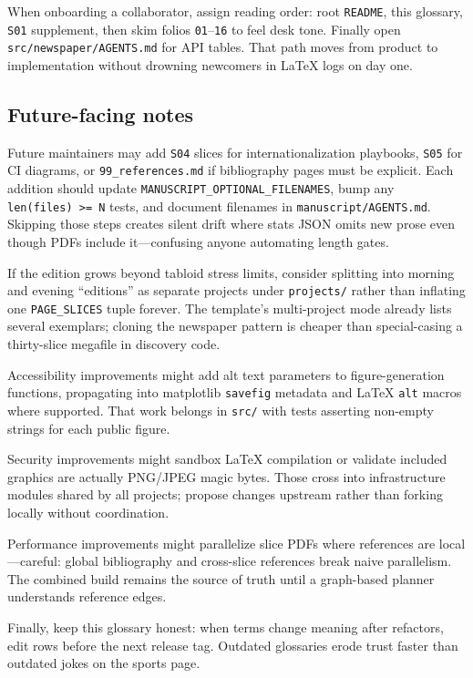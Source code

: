 \documentclass[
]{article}
\begin{document}
When onboarding a collaborator, assign reading order: root
\texttt{README}, this glossary, \texttt{S01} supplement, then skim
folios \texttt{01}--\texttt{16} to feel desk tone. Finally open
\texttt{src/newspaper/AGENTS.md} for API tables. That path moves from
product to implementation without drowning newcomers in LaTeX logs on
day one.

\subsection{Future-facing notes}\label{future-facing-notes}

Future maintainers may add \texttt{S04} slices for internationalization
playbooks, \texttt{S05} for CI diagrams, or \texttt{99\_references.md}
if bibliography pages must be explicit. Each addition should update
\texttt{MANUSCRIPT\_OPTIONAL\_FILENAMES}, bump any
\texttt{len(files)\ \textgreater{}=\ N} tests, and document filenames in
\texttt{manuscript/AGENTS.md}. Skipping those steps creates silent drift
where stats JSON omits new prose even though PDFs include it---confusing
anyone automating length gates.

If the edition grows beyond tabloid stress limits, consider splitting
into morning and evening ``editions'' as separate projects under
\texttt{projects/} rather than inflating one \texttt{PAGE\_SLICES} tuple
forever. The template's multi-project mode already lists several
exemplars; cloning the newspaper pattern is cheaper than special-casing
a thirty-slice megafile in discovery code.

Accessibility improvements might add alt text parameters to
figure-generation functions, propagating into matplotlib
\texttt{savefig} metadata and LaTeX \texttt{alt} macros where supported.
That work belongs in \texttt{src/} with tests asserting non-empty
strings for each public figure.

Security improvements might sandbox LaTeX compilation or validate
included graphics are actually PNG/JPEG magic bytes. Those cross into
infrastructure modules shared by all projects; propose changes upstream
rather than forking locally without coordination.

Performance improvements might parallelize slice PDFs where references
are local---careful: global bibliography and cross-slice references
break naive parallelism. The combined build remains the source of truth
until a graph-based planner understands reference edges.

Finally, keep this glossary honest: when terms change meaning after
refactors, edit rows before the next release tag. Outdated glossaries
erode trust faster than outdated jokes on the sports page.




\end{document}
